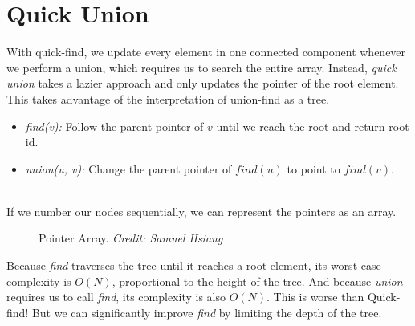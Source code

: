 \documentclass{article}
\begin{document}
\section{Quick Union}
With quick-find, we update every element in one connected component whenever we perform a union, which requires
us to search the entire array. Instead, \textit{quick union} takes a lazier approach and only updates the pointer of the root element.
This takes advantage of the interpretation of union-find as a tree.

\begin{itemize}
    \item \textit{find(v):} Follow the parent pointer of $v$ until we reach the root and return root id.
    \item \textit{union(u, v):} Change the parent pointer of $find(u)$ to point to $find(v)$.
\end{itemize}
\\
If we number our nodes sequentially, we can represent the pointers as an array.

\begin{figure}[h]
\centering
{
}
\caption{Pointer Array.
\textit{Credit: Samuel Hsiang}}
\end{figure}

Because \textit{find} traverses the tree until it reaches a root element, its worst-case complexity is $O(N)$, proportional to the height of the tree. And because \textit{union} requires us to call \textit{find}, its complexity is also $O(N)$. This is worse than Quick-find! But we can significantly improve \textit{find} by limiting the depth of the tree.
\end{document}
